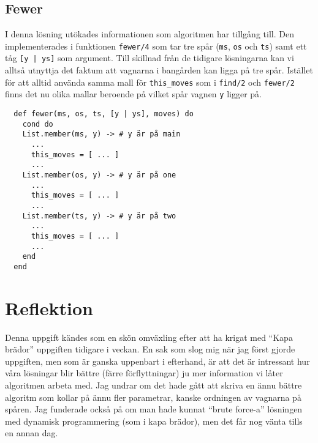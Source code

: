 \documentclass[a4paper,11pt]{article}
\begin{document}
\subsection*{Fewer}
I denna lösning utökades informationen som algoritmen har tillgång till. Den implementerades i funktionen {\tt fewer/4} som tar tre spår ({\tt ms}, {\tt os} och {\tt ts}) samt ett tåg {\tt [y | ys]} som argument. Till skillnad från de tidigare lösningarna kan vi alltså utnyttja det faktum att vagnarna i bangården kan ligga på tre spår. Istället för att alltid använda samma mall för {\tt this\_moves} som i {\tt find/2} och {\tt fewer/2} finns det nu olika mallar beroende på vilket spår vagnen {\tt y} ligger på.

\begin{verbatim}
  def fewer(ms, os, ts, [y | ys], moves) do
    cond do
    List.member(ms, y) -> # y är på main
      ...
      this_moves = [ ... ]
      ...
    List.member(os, y) -> # y är på one
      ...
      this_moves = [ ... ]
      ...
    List.member(ts, y) -> # y är på two
      ...
      this_moves = [ ... ]
      ...
    end
  end
\end{verbatim}

\section*{Reflektion}
Denna uppgift kändes som en skön omväxling efter att ha krigat med ``Kapa brädor'' uppgiften tidigare i veckan. En sak som slog mig när jag först gjorde uppgiften, men som är ganska uppenbart i efterhand, är att det är intressant hur våra lösningar blir bättre (färre förflyttningar) ju mer information vi låter algoritmen arbeta med. Jag undrar om det hade gått att skriva en ännu bättre algoritm som kollar på ännu fler parametrar, kanske ordningen av vagnarna på spåren. Jag funderade också på om man hade kunnat ``brute force-a'' lösningen  med dynamisk programmering (som i kapa brädor), men det får nog vänta tills en annan dag.
\end{document}

